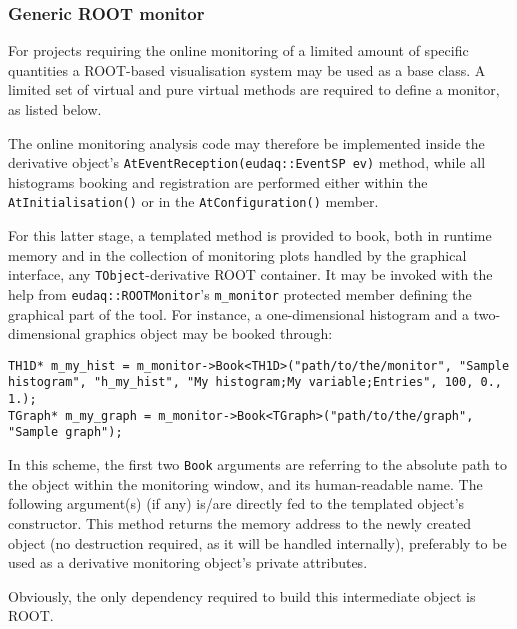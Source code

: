 \subsubsection{Generic ROOT monitor}
For projects requiring the online monitoring of a limited amount of specific quantities a ROOT-based visualisation system may be used as a base class.
A limited set of virtual and pure virtual methods are required to define a monitor, as listed below.



The online monitoring analysis code may therefore be implemented inside the derivative object's \lstinline[style=cpp]{AtEventReception(eudaq::EventSP ev)} method, while all histograms booking and registration are performed either within the \lstinline[style=cpp]{AtInitialisation()} or in the \lstinline[style=cpp]{AtConfiguration()} member.

For this latter stage, a templated method is provided to book, both in runtime memory and in the collection of monitoring plots handled by the graphical interface, any \lstinline[style=cpp]{TObject}-derivative ROOT container.
It may be invoked with the help from \lstinline[style=cpp]{eudaq::ROOTMonitor}'s \lstinline[style=cpp]{m_monitor} protected member defining the graphical part of the tool.
For instance, a one-dimensional histogram and a two-dimensional graphics object may be booked through:

\begin{lstlisting}[style=cpp]
TH1D* m_my_hist = m_monitor->Book<TH1D>("path/to/the/monitor", "Sample histogram", "h_my_hist", "My histogram;My variable;Entries", 100, 0., 1.);
TGraph* m_my_graph = m_monitor->Book<TGraph>("path/to/the/graph", "Sample graph");
\end{lstlisting}

In this scheme, the first two \lstinline[style=cpp]{Book} arguments are referring to the absolute path to the object within the monitoring window, and its human-readable name. The following argument(s) (if any) is/are directly fed to the templated object's constructor.
This method returns the memory address to the newly created object (no destruction required, as it will be handled internally), preferably to be used as a derivative monitoring object's private attributes.

Obviously, the only dependency required to build this intermediate object is ROOT.

